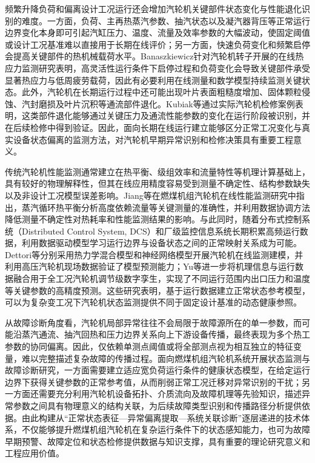 
频繁升降负荷和偏离设计工况运行还会增加汽轮机关键部件状态变化与性能退化识别的难度。一方面，负荷、主再热蒸汽参数、抽汽状态以及凝汽器背压等正常运行边界变化本身即可引起汽缸压力、温度、流量及效率参数的大幅波动，使固定阈值或设计工况基准难以直接用于长期在线评价；另一方面，快速负荷变化和频繁启停会提高关键部件的热机械载荷水平。Banaszkiewicz针对汽轮机转子开展的在线热应力监测研究表明，高灵活性运行条件下启停过程和负荷变化会导致关键部件承受显著热应力与低周疲劳载荷，因此有必要利用在线测量和数学模型持续监测关键状态\cite{Banaszkiewicz2016ThermalStress}。此外，汽轮机在长期运行过程中还可能出现叶片表面粗糙度增加、固体颗粒侵蚀、汽封磨损及叶片沉积等通流部件退化。Kubiak等通过实际汽轮机检修案例表明，这类部件退化能够通过关键压力及通流性能参数的变化在运行阶段被识别，并在后续检修中得到验证\cite{Kubiak2002TurbineDegradation}。因此，面向长期在线运行建立能够区分正常工况变化与真实设备状态偏离的监测方法，对汽轮机早期异常识别和检修决策具有重要工程意义。

传统汽轮机性能监测通常建立在热平衡、级组效率和流量特性等机理计算基础上，具有较好的物理解释性，但其在线应用精度容易受到测量不确定性、结构参数缺失以及非设计工况模型误差影响。Jiang等在燃煤机组汽轮机在线性能监测研究中指出，蒸汽循环热平衡分析高度依赖流量等关键测量的准确性，并利用数据协调方法降低测量不确定性对热耗率和性能监测结果的影响\cite{Jiang2014DataReconciliation}。与此同时，随着分布式控制系统（Distributed Control System, DCS）和厂级监控信息系统长期积累高频运行数据，利用数据驱动模型学习运行边界与设备状态之间的正常映射关系成为可能。Dettori等分别采用热力学混合模型和神经网络模型开展汽轮机在线监测建模，并利用高压汽轮机现场数据验证了模型预测能力\cite{Dettori2017MonitoringModels}；Yu等进一步将机理信息与运行数据融合用于全工况汽轮机调节级数字孪生，实现了不同运行范围内出口压力和温度等关键参数的高精度预测\cite{Yu2020HybridDigitalTwin}。这些研究表明，基于运行数据建立正常状态参考模型，可以为复杂变工况下汽轮机状态监测提供不同于固定设计基准的动态健康参照。

从故障诊断角度看，汽轮机局部异常往往不会局限于故障源所在的单一参数，而可能沿蒸汽通流、抽汽回热和压力边界关系向上下游设备传播，最终表现为多个热工参数的协同偏离。因此，仅依赖单测点阈值或将全部测点视为相互独立的特征变量，难以完整描述复杂故障的传播过程。面向燃煤机组汽轮机系统开展状态监测与故障诊断研究，一方面需要建立适应宽负荷运行条件的健康状态模型，在给定运行边界下获得关键参数的正常参考值，从而削弱正常工况迁移对异常识别的干扰；另一方面还需要充分利用汽轮机设备拓扑、介质流向及故障机理等先验知识，描述异常参数之间具有物理意义的结构关联，为后续故障类型识别和传播路径分析提供依据。由此构建从“正常状态表征—异常偏离提取—系统关联诊断”逐层递进的技术体系，不仅能够提升燃煤机组汽轮机在复杂运行条件下的状态感知能力，也可为故障早期预警、故障定位和状态检修提供数据与知识支撑，具有重要的理论研究意义和工程应用价值。

